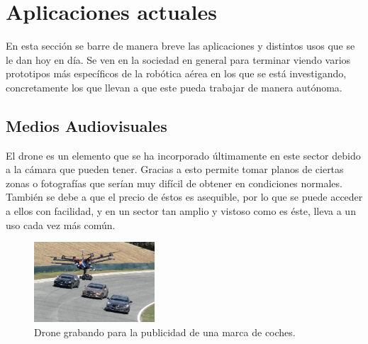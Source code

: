 \section{Aplicaciones actuales }
\hspace{1 cm} En esta secci\'on se barre de manera breve las aplicaciones y distintos usos que se le dan hoy en d\'ia. Se ven en la sociedad en general para terminar viendo varios prototipos m\'as espec\'ificos de la rob\'otica a\'erea en los que se est\'a investigando, concretamente los que llevan a que este pueda trabajar de manera aut\'onoma. 

\subsection{Medios Audiovisuales}
\hspace{1 cm} El drone es un elemento que se ha incorporado \'ultimamente en este sector debido a la c\'amara que pueden tener. Gracias a esto permite tomar planos de ciertas zonas o fotograf\'ias que ser\'ian muy dif\'icil de obtener en condiciones normales. Tambi\'en se debe a que el precio de \'estos es asequible, por lo que se puede acceder a ellos con facilidad, y en un sector tan amplio y vistoso como es \'este, lleva a un uso cada vez m\'as com\'un.
\begin{figure}[H]
	\centering
		\includegraphics[width=0.4\textwidth]{imgs/anuncio_television.jpg}
				\caption{Drone grabando para la publicidad de una marca de coches.}
	\label{fig:Drone grabando publicidad.}
\end{figure}


